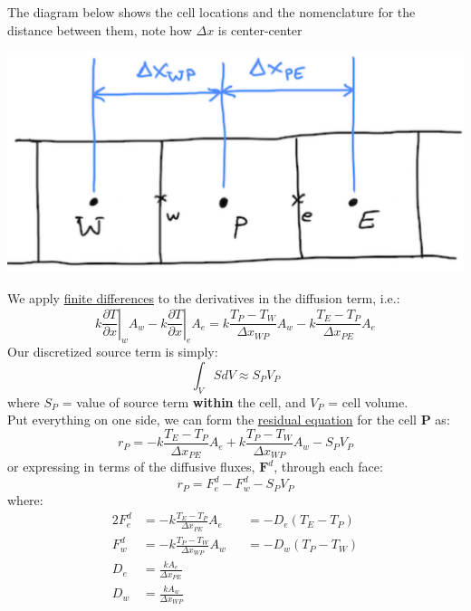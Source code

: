 \documentclass[11pt]{article}
\begin{document}
The diagram below shows the cell locations and the nomenclature for the distance between them, note how \(\Delta x\) is center-center
\begin{center}
\includegraphics[scale=0.2]{pic/heat1D_cell.png}
\end{center}
We apply \uline{finite differences} to the derivatives in the diffusion term, i.e.:
\begin{equation}
k \left .\frac{\partial T}{\partial x}\right|_w A_w - k \left .\frac{\partial T}{\partial x}\right|_e A_e
= k\frac{T_P-T_W}{\Delta x_{WP}}A_w - k\frac{T_E-T_P}{\Delta x_{PE}}A_e
\end{equation}
Our discretized source term is simply:
\begin{equation}
\int_V SdV \approx S_PV_P
\end{equation}
where \(S_P\) = value of source term \textbf{within} the cell, and \(V_P\) = cell volume.\\
Put everything on one side, we can form the \uline{residual equation} for the cell \(\textbf{P}\) as:
\begin{equation}
r_P = - k\frac{T_E-T_P}{\Delta x_{PE}}A_e + k\frac{T_P-T_W}{\Delta x_{WP}}A_w - S_PV_P
\end{equation}
or expressing in terms of the diffusive fluxes, \(\textbf{F}^d\), through each face:
\begin{equation}
r_P = F_{e}^d - F_{w}^d - S_PV_P
\end{equation}
where:\\
\begin{alignat}{2}
F_{e}^d &= - k\frac{T_E-T_P}{\Delta x_{PE}}A_e &&= -D_e(T_E- T_P)\\
F_{w}^d &= - k\frac{T_P-T_W}{\Delta x_{WP}}A_w &&= -D_w(T_P- T_W)\\
D_e &= \frac{kA_e}{\Delta x_{PE}}\\
D_w &= \frac{kA_w}{\Delta x_{WP}}
\end{alignat}
\end{document}
